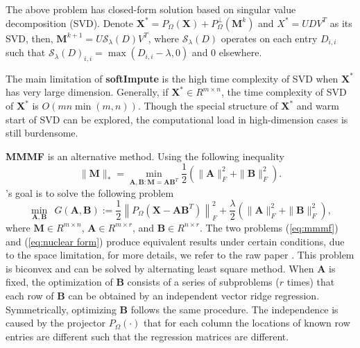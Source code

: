 \documentclass[11pt]{article}
\begin{document}
The above problem has closed-form solution based on singular value decomposition (SVD). Denote $\boldsymbol{X}^*=P_{\Omega}(\boldsymbol{X})+P_{\Omega}^{\perp}(\boldsymbol{M}^k)$ and  $X^*=UDV^T$ as its SVD, then, $\boldsymbol{M}^{k+1}=U\mathcal{S}_{\lambda}(D)V^T$, where $\mathcal{S}_{\lambda}(D)$ operates on each entry $D_{i,i}$ such that $\mathcal{S}_{\lambda}(D)_{i,i} = \max (D_{i,i}-\lambda,0)$ and 0 elsewhere. 

The main limitation of \textbf{softImpute} is the high time complexity of SVD when $\boldsymbol{X}^*$ has very large dimension. Generally, if $\boldsymbol{X}^* \in R^{m\times n}$, the time complexity of SVD of $\boldsymbol{X}^*$ is $O(mn \min(m,n))$. Though the special structure of $\boldsymbol{X}^*$ and warm start of SVD can be explored, the computational load in high-dimension cases is still burdensome.

\textbf{ MMMF} is an alternative method. Using the following inequality 
\begin{equation}
	\|\boldsymbol{M}\|_{*}=\min _{\boldsymbol{A}, \boldsymbol{B}: \boldsymbol{M}=\boldsymbol{A} \boldsymbol{B}^{T}} \frac{1}{2}\left(\|\boldsymbol{A}\|_{F}^{2}+\|\boldsymbol{B}\|_{F}^{2}\right).
	\label{eq:mmmf}
\end{equation}
\cite{srebro2004maximum}'s goal is to solve the following problem
\begin{equation}
	\underset{\boldsymbol{A},\boldsymbol{B}}{\operatorname{min}} \ \ G(\boldsymbol{A},\boldsymbol{B}):=\frac{1}{2}\left\|P_{\Omega}(\boldsymbol{X}-\boldsymbol{AB}^T)\right\|_{F}^{2}+\frac{\lambda}{2}\left(\|\boldsymbol{A}\|_{F}^{2}+\|\boldsymbol{B}\|_{F}^{2}\right),
	\label{eq:mmmf_als}
\end{equation}
	where $\boldsymbol{M} \in R^{m \times n }$, $\boldsymbol{A} \in R^{m \times r }$, and $\boldsymbol{B} \in R^{n \times r }$. The two problems (\ref{eq:mmmf}) and (\ref{eq:nuclear form}) produce equivalent results under certain conditions, due to the space limitation, for more details, we refer to the raw paper \citep{hastie2015matrix}. This problem is biconvex and can be solved by alternating least square method. When $\boldsymbol{A}$ is fixed, the optimization of $\boldsymbol{B}$ consists of a series of  subproblems ($r$ times) that each row of $\boldsymbol{B}$ can be obtained by an independent vector ridge regression. Symmetrically, optimizing $\boldsymbol{B}$ follows the same procedure. The independence is caused by the projector $P_{\Omega}(\cdot)$ that for each column the locations of known row entries are different such that the regression matrices are different. 
\end{document}

